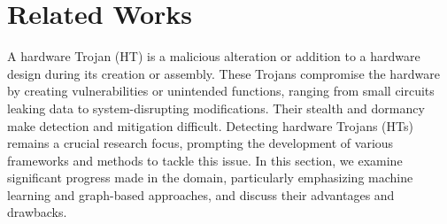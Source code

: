 \section{Related Works}
\label{sec:background} 


A hardware Trojan (HT) is a malicious alteration or addition to a hardware design during its creation or assembly. These Trojans compromise the hardware by creating vulnerabilities or unintended functions, ranging from small circuits leaking data to system-disrupting modifications. Their stealth and dormancy make detection and mitigation difficult. 
Detecting hardware Trojans (HTs) remains a crucial research focus, prompting the development of various frameworks and methods to tackle this issue. In this section, we examine significant progress made in the domain, particularly emphasizing machine learning and graph-based approaches, and discuss their advantages and drawbacks. 



